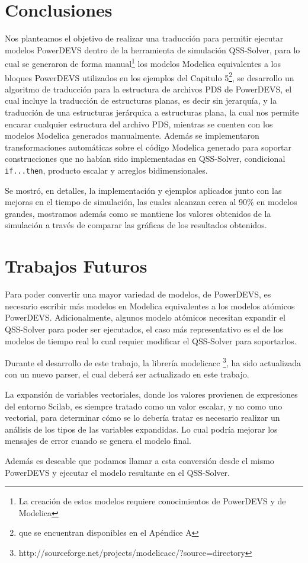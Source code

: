 
\section{Conclusiones}

	Nos planteamos el objetivo de realizar una traducción para permitir ejecutar modelos PowerDEVS dentro de la herramienta de simulación QSS-Solver, 
	para lo cual se generaron de forma manual\footnote{La creación de estos modelos requiere conocimientos de PowerDEVS y de Modelica} los modelos 
	Modelica equivalentes a los bloques PowerDEVS utilizados en los ejemplos del Capitulo 5\footnote{que se encuentran disponibles en el Apéndice A},
        se desarrollo un algoritmo de traducción para la estructura de archivos PDS de PowerDEVS, el cual incluye la traducción de estructuras planas,
	 es decir sin jerarquía, y la traducción de una estructuras jerárquica a estructuras plana, la cual nos permite encarar cualquier estructura 
	del archivo PDS, mientras se cuenten con los modelos Modelica generados manualmente. Además se implementaron transformaciones automáticas 
	sobre el código Modelica generado para soportar construcciones que no habían sido implementadas en QSS-Solver, condicional \texttt{if...then}, 
	producto escalar y arreglos bidimensionales.

	Se mostró, en detalles, la implementación y ejemplos aplicados junto con las mejoras en el tiempo de simulación, las cuales alcanzan cerca al 90\%
	 en modelos grandes, mostramos además como se mantiene los valores obtenidos de la simulación a través de comparar las gráficas de los resultados obtenidos.

\section{Trabajos Futuros}
	Para poder convertir una mayor variedad de modelos, de PowerDEVS, es necesario escribir más modelos en Modelica equivalentes a los modelos atómicos PowerDEVS.
	Adicionalmente, algunos modelo atómicos necesitan expandir el QSS-Solver para poder ser ejecutados, el caso más representativo es el de los modelos de tiempo
	 real lo cual requier modificar el QSS-Solver para soportarlos.

	Durante el desarrollo de este trabajo, la librería modelicacc \footnote{http://sourceforge.net/projects/modelicacc/?source=directory}, ha sido actualizada 
	con un nuevo parser, el cual deberá ser actualizado en este trabajo.

	La expansión de variables vectoriales, donde los valores provienen de expresiones del entorno Scilab, es siempre tratado como un valor escalar, y no como 
	uno vectorial, para determinar cómo se lo debería tratar es necesario realizar un análisis de los tipos de las variables expandidas. 
	Lo cual podría mejorar los mensajes de error cuando se genera el modelo final.

	Además es deseable que podamos llamar a esta conversión desde el mismo PowerDEVS y ejecutar el modelo resultante en el QSS-Solver.

